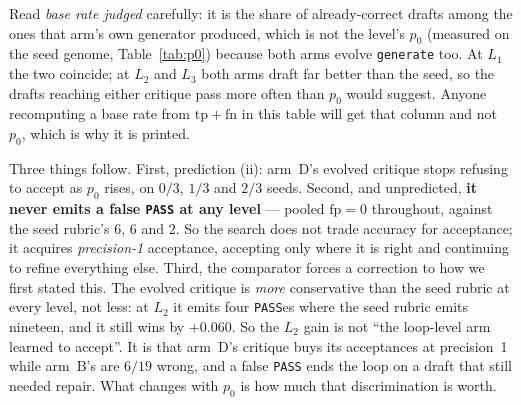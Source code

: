 \documentclass[11pt]{article}
\begin{document}
Read \emph{base rate judged} carefully: it is the share of already-correct drafts among the
ones that arm's own generator produced, which is not the level's $p_0$ (measured on the seed
genome, Table~\ref{tab:p0}) because both arms evolve \texttt{generate} too. At $L_1$ the two
coincide; at $L_2$ and $L_3$ both arms draft far better than the seed, so the drafts reaching
either critique pass more often than $p_0$ would suggest. Anyone recomputing a base rate from
$\mathrm{tp}+\mathrm{fn}$ in this table will get that column and not $p_0$, which is why it is
printed.

Three things follow. First, prediction (ii): arm~D's evolved critique stops refusing to accept
as $p_0$ rises, on $0/3$, $1/3$ and $2/3$ seeds. Second, and unpredicted, \textbf{it never
emits a false \texttt{PASS} at any level} --- pooled $\mathrm{fp} = 0$ throughout, against the
seed rubric's $6$, $6$ and $2$. So the search does not trade accuracy for acceptance; it
acquires \emph{precision-1} acceptance, accepting only where it is right and continuing to
refine everything else. Third, the comparator forces a correction to how we first stated this.
The evolved critique is \emph{more} conservative than the seed rubric at every level, not less:
at $L_2$ it emits four \texttt{PASS}es where the seed rubric emits nineteen, and it still wins
by $+0.060$. So the $L_2$ gain is not ``the loop-level arm learned to accept''. It is that
arm~D's critique buys its acceptances at precision~1 while arm~B's are $6/19$ wrong, and a
false \texttt{PASS} ends the loop on a draft that still needed repair. What changes with $p_0$
is how much that discrimination is worth.
\end{document}
